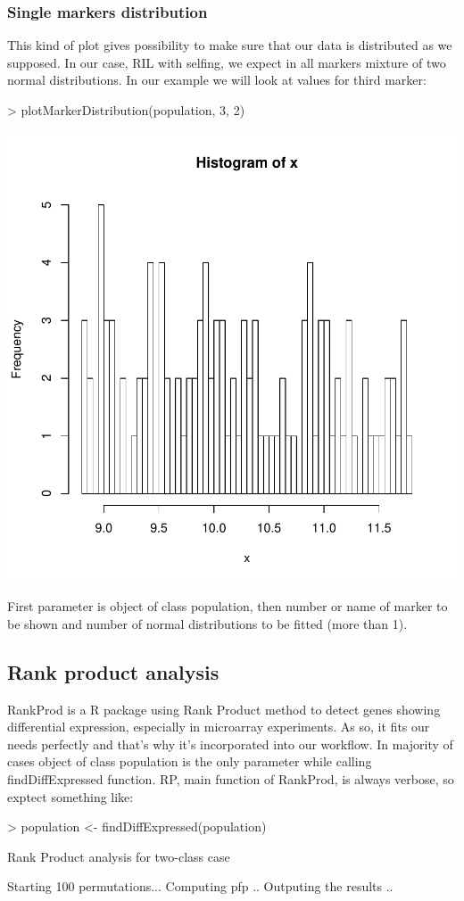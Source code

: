 \documentclass{article}
\begin{document}
\subsubsection{Single markers distribution}
This kind of plot gives possibility to make sure that our data is distributed as we supposed. In our case, RIL with selfing, we expect in all markers mixture of two normal distributions.
In our example we will look at values for third marker:
\begin{Schunk}
\begin{Sinput}
> plotMarkerDistribution(population, 3, 2)
\end{Sinput}
\end{Schunk}
\includegraphics{manual-008}

{\noindent}First parameter is object of class population, then number or name of marker to be shown and number of normal distributions to be fitted (more than 1).
\newpage
\subsection{Rank product analysis}
RankProd \citep{Hong:2006} is a R package using Rank Product \citep{Breitling200483} method to detect genes showing differential expression, especially in microarray experiments. As so, it fits our needs perfectly and that's why it's incorporated into our workflow. 
In majority of cases object of class population is the only parameter while calling findDiffExpressed function. RP, main function of RankProd, is always verbose, so exptect something like:
\begin{Schunk}
\begin{Sinput}
> population <- findDiffExpressed(population)
\end{Sinput}
\begin{Soutput}
Rank Product analysis for two-class case 
 
Starting 100 permutations... 
Computing pfp .. 
Outputing the results .. 
\end{Soutput}
\end{Schunk}
\end{document}
